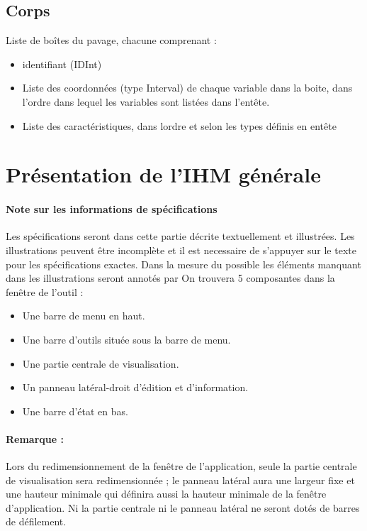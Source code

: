 \documentclass[a4paper]{article}
\begin{document}
\subsection{Corps}
Liste de boîtes du pavage, chacune comprenant :
\begin{itemize}
\item identifiant (IDInt)
\item Liste des coordonnées (type Interval) de chaque variable dans la boite, dans l'ordre dans lequel les variables sont listées dans l'entête.
\item Liste des caractéristiques, dans lordre et selon les types définis en entête
\end{itemize}

\section{Présentation de l'IHM générale}
\paragraph{Note sur les informations de spécifications}
Les spécifications seront dans cette partie décrite textuellement et illustrées. Les illustrations peuvent être incomplète et il est necessaire de s'appuyer sur le texte pour les spécifications exactes. Dans la mesure du possible les éléments manquant dans les illustrations seront annotés par \danger 
On trouvera 5 composantes dans la fenêtre de l'outil :
\begin{itemize}
\item Une barre de menu en haut.
\item Une barre d'outils située sous la barre de menu.
\item Une partie centrale de visualisation.
\item Un panneau latéral-droit d'édition et d'information.
\item Une barre d'état en bas.
\end{itemize}

\paragraph{Remarque :} Lors du redimensionnement de la fenêtre de l'application, seule la partie centrale de visualisation sera redimensionnée ; le panneau latéral aura une largeur fixe et une hauteur minimale qui définira aussi la hauteur minimale de la fenêtre d'application. Ni la partie centrale ni le panneau latéral ne seront dotés de barres de défilement.
\end{document}
